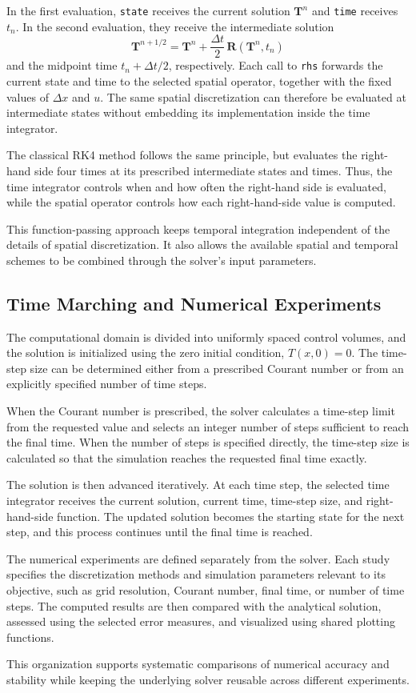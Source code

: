 In the first evaluation, \texttt{state} receives the current solution $\mathbf{T}^{n}$ and \texttt{time} receives $t_n$. In the second evaluation, they receive the intermediate solution
\begin{equation}
    \mathbf{T}^{n+1/2} = \mathbf{T}^{n}
    + \frac{\Delta t}{2}\,\mathbf{R}(\mathbf{T}^{n},t_n)
\end{equation}
and the midpoint time $t_n+\Delta t/2$, respectively. Each call to \texttt{rhs} forwards the current state and time to the selected spatial operator, together with the fixed values of $\Delta x$ and $u$. The same spatial discretization can therefore be evaluated at intermediate states without embedding its implementation inside the time integrator.

The classical RK4 method follows the same principle, but evaluates the right-hand side four times at its prescribed intermediate states and times. Thus, the time integrator controls when and how often the right-hand side is evaluated, while the spatial operator controls how each right-hand-side value is computed.

This function-passing approach keeps temporal integration independent of the details of spatial discretization. It also allows the available spatial and temporal schemes to be combined through the solver's input parameters.

\subsection{Time Marching and Numerical Experiments}
\label{subsec:time-marching-experiments}

The computational domain is divided into uniformly spaced control volumes, and the solution is initialized using the zero initial condition, $T(x,0)=0$. The time-step size can be determined either from a prescribed Courant number or from an explicitly specified number of time steps.

When the Courant number is prescribed, the solver calculates a time-step limit from the requested value and selects an integer number of steps sufficient to reach the final time. When the number of steps is specified directly, the time-step size is calculated so that the simulation reaches the requested final time exactly.

The solution is then advanced iteratively. At each time step, the selected time integrator receives the current solution, current time, time-step size, and right-hand-side function. The updated solution becomes the starting state for the next step, and this process continues until the final time is reached.

The numerical experiments are defined separately from the solver. Each study specifies the discretization methods and simulation parameters relevant to its objective, such as grid resolution, Courant number, final time, or number of time steps. The computed results are then compared with the analytical solution, assessed using the selected error measures, and visualized using shared plotting functions.

This organization supports systematic comparisons of numerical accuracy and stability while keeping the underlying solver reusable across different experiments.
